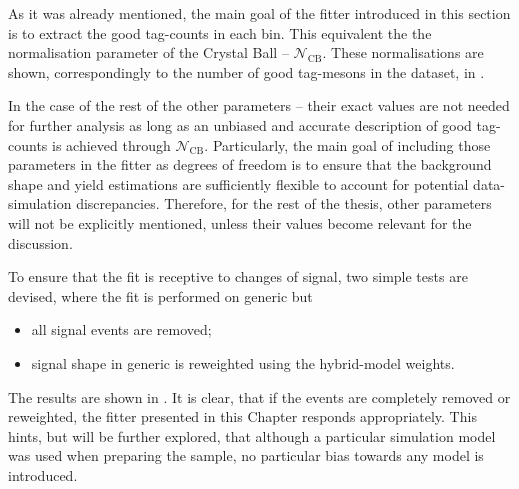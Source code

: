 As it was already mentioned, the main goal of the \Mbc fitter introduced in this section is to extract the good tag-\B counts in each \EB bin.
This equivalent the the normalisation parameter of the Crystal Ball \PDF -- $\mathcal{N}_{\mathrm{CB}}$.
These normalisations are shown, correspondingly to the number of good tag-\B mesons in the dataset, in .

In the case of the rest of the other parameters -- their exact values are not needed for further analysis as long as an unbiased and accurate description of good tag-\B counts is achieved through $\mathcal{N}_{\mathrm{CB}}$.
Particularly, the main goal of including those parameters in the fitter as degrees of freedom is to ensure that the \Mbc background shape and yield estimations are sufficiently flexible to account for potential data-simulation discrepancies.
Therefore, for the rest of the thesis, other parameters will not be explicitly mentioned, unless their values become relevant for the discussion.

To ensure that the fit is receptive to changes of \BtoXsgamma signal, two simple tests are devised, where the fit is performed on generic \MC but
\begin{itemize}
    \item all \BtoXsgamma signal events are removed;
    \item \BtoXsgamma signal shape in generic \MC is reweighted using the hybrid-model weights.
\end{itemize}
The results are shown in .
It is clear, that if the \BtoXsgamma events are completely removed or reweighted, the \Mbc fitter presented in this Chapter responds appropriately.
This hints, but will be further explored, that although a particular simulation model was used when preparing the sample, no particular bias towards any \BtoXsgamma model is introduced.


